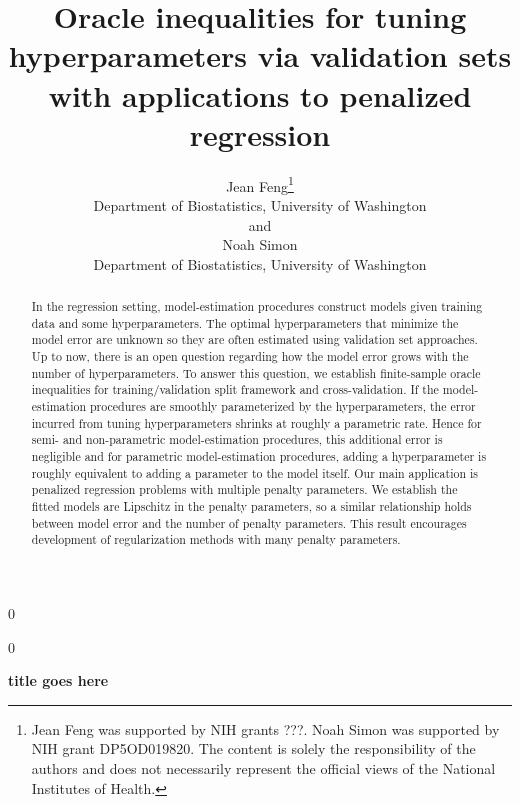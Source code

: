 \documentclass[12pt]{article}
\newcommand{\blind}{0}
\begin{document}
\def\spacingset#1{\renewcommand{\baselinestretch}%
{#1}\small\normalsize} \spacingset{1}



\blind
{
  \title{\bf Oracle inequalities for tuning hyperparameters via validation sets with applications to penalized regression}
  \author{Jean Feng\thanks{
    Jean Feng was supported by NIH grants ???. %
    Noah Simon was supported by NIH grant DP5OD019820.
    The content is solely the responsibility of the authors and does not necessarily represent the official views of the National Institutes of Health.}\\
    Department of Biostatistics, University of Washington\\
    and \\
    Noah Simon \\
    Department of Biostatistics, University of Washington}
  \maketitle
} \fi

\blind
{
  \bigskip
  \bigskip
  \bigskip
  \begin{center}
    {\LARGE\bf title goes here}
\end{center}
  \medskip
} \fi

\bigskip
\begin{abstract}

In the regression setting, model-estimation procedures construct models given training data and some  hyperparameters. The optimal hyperparameters that minimize the model error are unknown so they are often estimated using validation set approaches. Up to now, there is an open question regarding how the model error grows with the number of hyperparameters. To answer this question, we establish finite-sample oracle inequalities for training/validation split framework and cross-validation. If the model-estimation procedures are smoothly parameterized by the hyperparameters, the error incurred from tuning hyperparameters shrinks at roughly a parametric rate. Hence for semi- and non-parametric model-estimation procedures, this additional error is negligible and for parametric model-estimation procedures, adding a hyperparameter is roughly equivalent to adding a parameter to the model itself. Our main application is penalized regression problems with multiple penalty parameters. We establish the fitted models are Lipschitz in the penalty parameters, so a similar relationship holds between model error and the number of penalty parameters. This result encourages development of regularization methods with many penalty parameters.
\end{abstract}
\end{document}
